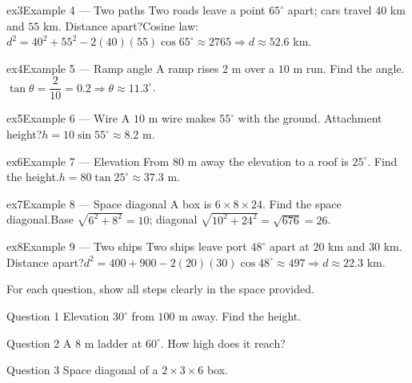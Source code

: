 \documentclass[11pt]{article}
\begin{document}
\begin{example}{ex3}{Example 4 --- Two paths}
Two roads leave a point $65^\circ$ apart; cars travel $40$ km and $55$ km. Distance apart?\soln Cosine law: $d^2=40^2+55^2-2(40)(55)\cos65^\circ\approx2765\Rightarrow d\approx52.6$ km.
\end{example}

\begin{example}{ex4}{Example 5 --- Ramp angle}
A ramp rises $2$ m over a $10$ m run. Find the angle.\soln $\tan\theta=\dfrac{2}{10}=0.2\Rightarrow\theta\approx11.3^\circ$.
\end{example}

\begin{example}{ex5}{Example 6 --- Wire}
A $10$ m wire makes $55^\circ$ with the ground. Attachment height?\soln $h=10\sin55^\circ\approx8.2$ m.
\end{example}

\begin{example}{ex6}{Example 7 --- Elevation}
From $80$ m away the elevation to a roof is $25^\circ$. Find the height.\soln $h=80\tan25^\circ\approx37.3$ m.
\end{example}

\begin{example}{ex7}{Example 8 --- Space diagonal}
A box is $6\times8\times24$. Find the space diagonal.\soln Base $\sqrt{6^2+8^2}=10$; diagonal $\sqrt{10^2+24^2}=\sqrt{676}=26$.
\end{example}

\begin{example}{ex8}{Example 9 --- Two ships}
Two ships leave port $48^\circ$ apart at $20$ km and $30$ km. Distance apart?\soln $d^2=400+900-2(20)(30)\cos48^\circ\approx497\Rightarrow d\approx22.3$ km.
\end{example}

\clearpage
{}
For each question, show all steps clearly in the space provided.

\begin{qbox}{Question 1}
Elevation $30^\circ$ from $100$ m away. Find the height.\workspace{3cm}
\end{qbox}

\begin{qbox}{Question 2}
A $8$ m ladder at $60^\circ$. How high does it reach?\workspace{2.4cm}
\end{qbox}

\begin{qbox}{Question 3}
Space diagonal of a $2\times3\times6$ box.\workspace{3cm}
\end{qbox}
\end{document}
